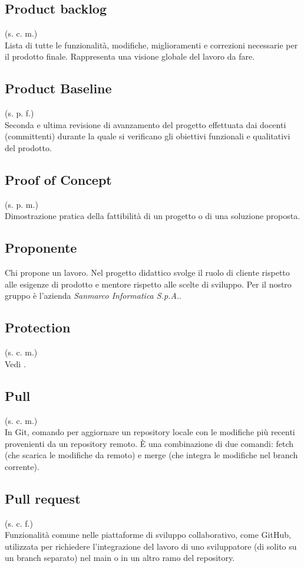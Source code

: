     \subsection{Product backlog}
    \label{Product backlog}
    (s. c. m.)\\
    Lista di tutte le funzionalità, modifiche, miglioramenti e correzioni necessarie 
    per il prodotto finale. Rappresenta una visione globale del lavoro da fare.
    \subsection{Product Baseline}
    \label{Product Baseline}
    (s. p. f.)\\
    Seconda e ultima revisione di avanzamento del progetto effettuata dai docenti (committenti) 
    durante la quale si verificano gli obiettivi funzionali e qualitativi del prodotto. 
    \subsection{Proof of Concept}
    \label{Proof of Concept}
    (s. p. m.)\\
    Dimostrazione pratica della fattibilità di un progetto o di una soluzione proposta.
    \subsection{Proponente}
    \label{Proponente}
    Chi propone un lavoro. Nel progetto didattico svolge il ruolo di cliente 
    rispetto alle esigenze di prodotto e mentore rispetto alle scelte di sviluppo.
    Per il nostro gruppo è l'azienda \textit{Sanmarco Informatica S.p.A.}.
    \subsection{Protection}
    (s. c. m.)\\
    Vedi .
    \subsection{Pull}
    (s. c. m.)\\
    In Git, comando per aggiornare un repository locale con le modifiche più recenti provenienti 
    da un repository remoto. È una combinazione di due comandi: fetch (che scarica le modifiche 
    da remoto) e merge (che integra le modifiche nel branch corrente).
    \subsection{Pull request}
    (s. c. f.)\\
    Funzionalità comune nelle piattaforme di sviluppo collaborativo, come GitHub, utilizzata per 
    richiedere l'integrazione del lavoro di uno sviluppatore (di solito su un branch separato) 
    nel main o in un altro ramo del repository.
